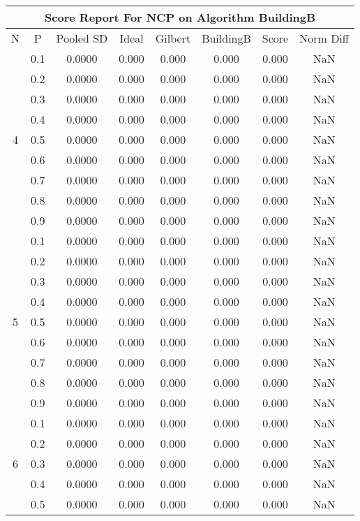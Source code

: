 \documentclass[11pt,a4paper]{report}
\begin{document}
\begin{longtable}{ | c | c || c | c | c | c | c | c | }
\hline
\multicolumn{8}{|c|}{ Score Report For NCP on Algorithm BuildingB} \\
\hline
N & P & Pooled SD &  Ideal &  Gilbert & BuildingB  & Score & Norm Diff \\
 \hline
 \hline
 \endhead
\multirow{9}{*}{4} & 0.1 & 0.0000 & 0.000 & 0.000 & 0.000 & 0.000 & NaN \\
 & 0.2 & 0.0000 & 0.000 & 0.000 & 0.000 & 0.000 & NaN \\
 & 0.3 & 0.0000 & 0.000 & 0.000 & 0.000 & 0.000 & NaN \\
 & 0.4 & 0.0000 & 0.000 & 0.000 & 0.000 & 0.000 & NaN \\
 & 0.5 & 0.0000 & 0.000 & 0.000 & 0.000 & 0.000 & NaN \\
 & 0.6 & 0.0000 & 0.000 & 0.000 & 0.000 & 0.000 & NaN \\
 & 0.7 & 0.0000 & 0.000 & 0.000 & 0.000 & 0.000 & NaN \\
 & 0.8 & 0.0000 & 0.000 & 0.000 & 0.000 & 0.000 & NaN \\
 & 0.9 & 0.0000 & 0.000 & 0.000 & 0.000 & 0.000 & NaN \\
 \hline
\multirow{9}{*}{5} & 0.1 & 0.0000 & 0.000 & 0.000 & 0.000 & 0.000 & NaN \\
 & 0.2 & 0.0000 & 0.000 & 0.000 & 0.000 & 0.000 & NaN \\
 & 0.3 & 0.0000 & 0.000 & 0.000 & 0.000 & 0.000 & NaN \\
 & 0.4 & 0.0000 & 0.000 & 0.000 & 0.000 & 0.000 & NaN \\
 & 0.5 & 0.0000 & 0.000 & 0.000 & 0.000 & 0.000 & NaN \\
 & 0.6 & 0.0000 & 0.000 & 0.000 & 0.000 & 0.000 & NaN \\
 & 0.7 & 0.0000 & 0.000 & 0.000 & 0.000 & 0.000 & NaN \\
 & 0.8 & 0.0000 & 0.000 & 0.000 & 0.000 & 0.000 & NaN \\
 & 0.9 & 0.0000 & 0.000 & 0.000 & 0.000 & 0.000 & NaN \\
 \hline
\multirow{9}{*}{6} & 0.1 & 0.0000 & 0.000 & 0.000 & 0.000 & 0.000 & NaN \\
 & 0.2 & 0.0000 & 0.000 & 0.000 & 0.000 & 0.000 & NaN \\
 & 0.3 & 0.0000 & 0.000 & 0.000 & 0.000 & 0.000 & NaN \\
 & 0.4 & 0.0000 & 0.000 & 0.000 & 0.000 & 0.000 & NaN \\
 & 0.5 & 0.0000 & 0.000 & 0.000 & 0.000 & 0.000 & NaN \\

\end{longtable}
\end{document}
